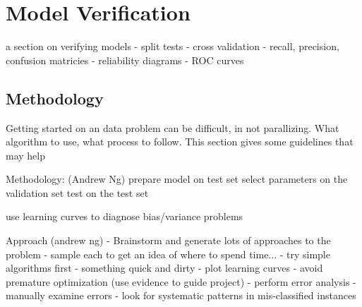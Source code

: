 
\section{Model Verification} 
\label{advanced:verification}

a section on verifying models
- split tests
- cross validation
- recall, precision, confusion matricies
- reliability diagrams
- ROC curves


\subsection{Methodology}
Getting started on an data problem can be difficult, in not parallizing. What algorithm to use, what process to follow. This section gives some guidelines that may help 


Methodology: (Andrew Ng)
prepare model on test set
select parameters on the validation set
test on the test set

use learning curves to diagnose bias/variance problems


Approach (andrew ng)
- Brainstorm and generate lots of approaches to the problem - sample each to get an idea of where to spend time...
- try simple algorithms first - something quick and dirty
- plot learning curves
	- avoid premature optimization (use evidence to guide project)
- perform error analysis
	- manually examine errors
	- look for systematic patterns in mis-classified instances